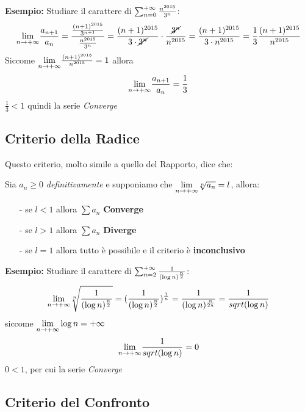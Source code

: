 \documentclass[12pt, a4paper, openany]{book}
\newcommand{\esempio}[1]{\begin{box_esempio} \textbf{Esempio: }#1\end{box_esempio}}
\newcommand{\definizione}[1]{\begin{box_definizione} #1 \end{box_definizione}}
\begin{document}
\esempio{
    Studiare il carattere di $\sum_{n=0}^{+\infty} \frac{n^{2015}}{3^n}$:
    \begin{equation*}
        \underset{n \to +\infty}{\lim} \frac{a_{n+1}}{a_n} = \frac{\frac{(n+1)^{2015}}{3^{n+1}}}{\frac{n^{2015}}{3^n}} = 
        \frac{(n+1)^{2015}}{3 \cdot \cancel{3^n}} \cdot \frac{\cancel{3^n}}{n^{2015}} =
        \frac{(n+1)^{2015}}{3 \cdot n^{2015}} = \frac{1}{3} \frac{(n+1)^{2015}}{n^{2015}}
    \end{equation*}
    Siccome $\underset{n \to +\infty}{\lim} \frac{(n+1)^{2015}}{n^{2015}} = 1$ allora
    \begin{equation*}
        \underset{n \to +\infty}{\lim} \frac{a_{n+1}}{a_n} = \frac{1}{3}
    \end{equation*}
    $\frac{1}{3} < 1$ quindi la serie \emph{Converge}
}

\subsection{Criterio della Radice}
Questo criterio, molto simile a quello del Rapporto, dice che:
\definizione{
    Sia $a_n \geq 0$ \emph{definitivamente} e supponiamo che $\underset{n \to +\infty}{\lim} \sqrt[n]{a_n} = l$, allora:
    \begin{itemize}
        \item[-] se $l<1$ allora $\sum a_n$ \textbf{Converge}
        \item[-] se $l>1$ allora $\sum a_n$ \textbf{Diverge}
        \item[-] se $l=1$ allora tutto è possibile e il criterio è \textbf{inconclusivo}  
    \end{itemize}
}
\esempio{
    Studiare il carattere di $\sum_{n=2}^{+\infty} \frac{1}{(\log n)^{\frac{n}{2}}}$:
    \begin{equation*}
        \underset{n \to +\infty}{\lim} \sqrt[n]{\frac{1}{(\log n)^{\frac{n}{2}}}} =
        (\frac{1}{(\log n)^{\frac{n}{2}}})^{\frac{1}{n}} = 
        \frac{1}{(\log n)^{\frac{n}{2n}}} =
        \frac{1}{sqrt{(\log n)}}
    \end{equation*}
    siccome $\underset{n \to +\infty}{\lim} \log n = +\infty$
    \begin{equation*}
        \underset{n \to +\infty}{\lim} \frac{1}{sqrt{(\log n)}} = 0
    \end{equation*} 
    $0 < 1$, per cui la serie \emph{Converge}
}

\subsection{Criterio del Confronto}
\end{document}
